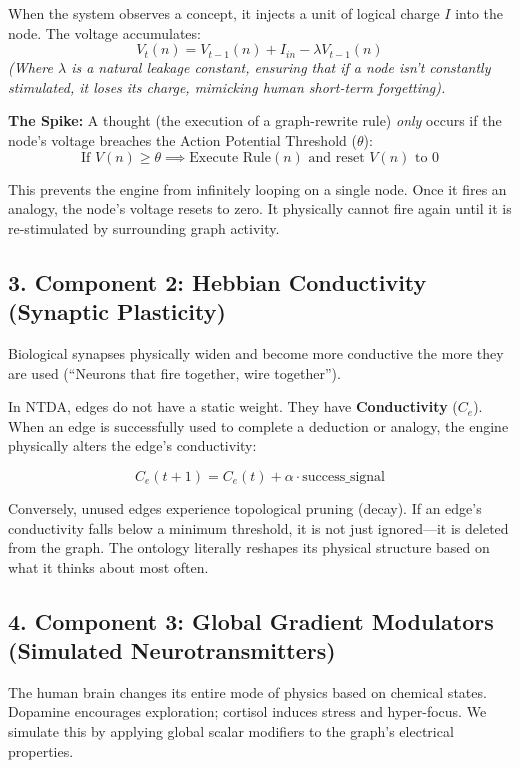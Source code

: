 \documentclass[
  11pt,
  a4paper,
]{article}
\begin{document}
When the system observes a concept, it injects a unit of logical charge
\(I\) into the node. The voltage accumulates:
\[ V_t(n) = V_{t-1}(n) + I_{in} - \lambda V_{t-1}(n) \] \emph{(Where
\(\lambda\) is a natural leakage constant, ensuring that if a node isn't
constantly stimulated, it loses its charge, mimicking human short-term
forgetting).}

\textbf{The Spike:} A thought (the execution of a graph-rewrite rule)
\emph{only} occurs if the node's voltage breaches the Action Potential
Threshold (\(\theta\)):
\[ \text{If } V(n) \ge \theta \implies \text{Execute Rule}(n) \text{ and reset } V(n) \text{ to } 0 \]

This prevents the engine from infinitely looping on a single node. Once
it fires an analogy, the node's voltage resets to zero. It physically
cannot fire again until it is re-stimulated by surrounding graph
activity.

\subsection{3. Component 2: Hebbian Conductivity (Synaptic
Plasticity)}\label{component-2-hebbian-conductivity-synaptic-plasticity}

Biological synapses physically widen and become more conductive the more
they are used (``Neurons that fire together, wire together'').

In NTDA, edges do not have a static weight. They have
\textbf{Conductivity} (\(C_{e}\)). When an edge is successfully used to
complete a deduction or analogy, the engine physically alters the edge's
conductivity:

\[ C_e(t+1) = C_e(t) + \alpha \cdot \text{success\_signal} \]

Conversely, unused edges experience topological pruning (decay). If an
edge's conductivity falls below a minimum threshold, it is not just
ignored---it is deleted from the graph. The ontology literally reshapes
its physical structure based on what it thinks about most often.

\subsection{4. Component 3: Global Gradient Modulators (Simulated
Neurotransmitters)}\label{component-3-global-gradient-modulators-simulated-neurotransmitters}

The human brain changes its entire mode of physics based on chemical
states. Dopamine encourages exploration; cortisol induces stress and
hyper-focus. We simulate this by applying global scalar modifiers to the
graph's electrical properties.
\end{document}

